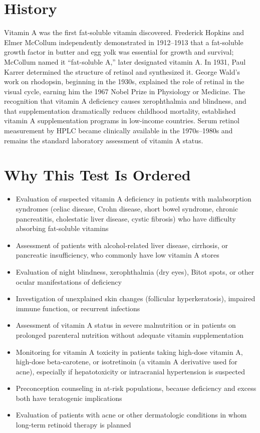 \section*{History}
Vitamin A was the first fat-soluble vitamin discovered. Frederick Hopkins and Elmer McCollum independently demonstrated in 1912--1913 that a fat-soluble growth factor in butter and egg yolk was essential for growth and survival; McCollum named it ``fat-soluble A,'' later designated vitamin A. In 1931, Paul Karrer determined the structure of retinol and synthesized it. George Wald's work on rhodopsin, beginning in the 1930s, explained the role of retinal in the visual cycle, earning him the 1967 Nobel Prize in Physiology or Medicine. The recognition that vitamin A deficiency causes xerophthalmia and blindness, and that supplementation dramatically reduces childhood mortality, established vitamin A supplementation programs in low-income countries. Serum retinol measurement by HPLC became clinically available in the 1970s--1980s and remains the standard laboratory assessment of vitamin A status.

\section*{Why This Test Is Ordered}
\begin{itemize}
  \item Evaluation of suspected vitamin A deficiency in patients with malabsorption syndromes (celiac disease, Crohn disease, short bowel syndrome, chronic pancreatitis, cholestatic liver disease, cystic fibrosis) who have difficulty absorbing fat-soluble vitamins
  \item Assessment of patients with alcohol-related liver disease, cirrhosis, or pancreatic insufficiency, who commonly have low vitamin A stores
  \item Evaluation of night blindness, xerophthalmia (dry eyes), Bitot spots, or other ocular manifestations of deficiency
  \item Investigation of unexplained skin changes (follicular hyperkeratosis), impaired immune function, or recurrent infections
  \item Assessment of vitamin A status in severe malnutrition or in patients on prolonged parenteral nutrition without adequate vitamin supplementation
  \item Monitoring for vitamin A toxicity in patients taking high-dose vitamin A, high-dose beta-carotene, or isotretinoin (a vitamin A derivative used for acne), especially if hepatotoxicity or intracranial hypertension is suspected
  \item Preconception counseling in at-risk populations, because deficiency and excess both have teratogenic implications
  \item Evaluation of patients with acne or other dermatologic conditions in whom long-term retinoid therapy is planned
\end{itemize}

